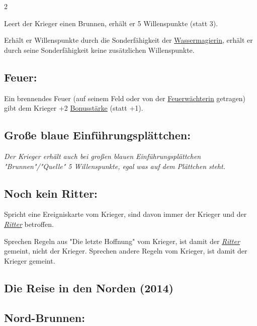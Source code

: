 \documentclass[10pt, a4paper, oneside]{book}
\newcommand{\fan}[1]{\textit{#1}}
\begin{document}
\begin{multicols*}{2}
\begin{nobgcolor}
Leert der Krieger einen Brunnen, erhält er 5 Willenspunkte (statt 3).

Erhält er Willenspunkte durch die Sonderfähigkeit der \hyperref[wassermagierin]{Wassermagierin}, erhält er durch seine Sonderfähigkeit keine zusätzlichen Willenspunkte.


\subsection{Feuer:}

Ein brennendes Feuer (auf seinem Feld oder von der \hyperref[feuerwaechterin]{Feuerwächterin} getragen) gibt dem Krieger +2 \hyperref[bonusstaerke]{Bonusstärke} (statt +1).
\supercite{dek-begleitheft}



\subsection{Große blaue Einführungsplättchen:}

\fan{Der Krieger erhält auch bei großen blauen Einführungsplättchen "Brunnen"/"Quelle" 5 Willenspunkte, egal was auf dem Plättchen steht.}





\subsection{Noch kein Ritter:}

Spricht eine Ereigniskarte vom Krieger, sind davon immer der Krieger und der \hyperref[ritter]{\fan{Ritter}} betroffen.

Sprechen Regeln aus "Die letzte Hoffnung" vom Krieger, ist damit der \hyperref[ritter]{\fan{Ritter}} gemeint, nicht der Krieger. Sprechen andere Regeln vom Krieger, ist damit der Krieger gemeint.




\end{nobgcolor}

\begin{bgcolor}
\section{Die Reise in den Norden (2014)}


\subsection{Nord-Brunnen:}


\end{bgcolor}
\end{multicols*}
\end{document}
